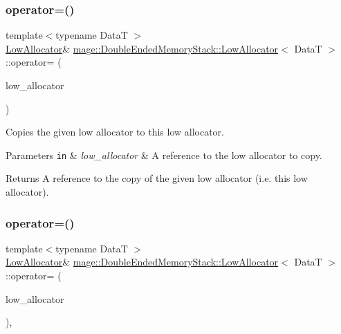 \subsubsection{\texorpdfstring{operator=()}{operator=()}\hspace{0.1cm}{\footnotesize\ttfamily [1/2]}}
{\footnotesize\ttfamily template$<$typename DataT $>$ \\
\hyperlink{classmage_1_1_double_ended_memory_stack_1_1_low_allocator}{Low\+Allocator}\& \hyperlink{classmage_1_1_double_ended_memory_stack_1_1_low_allocator}{mage\+::\+Double\+Ended\+Memory\+Stack\+::\+Low\+Allocator}$<$ DataT $>$\+::operator= (\begin{DoxyParamCaption}\item[{const \hyperlink{classmage_1_1_double_ended_memory_stack_1_1_low_allocator}{Low\+Allocator}$<$ DataT $>$ \&}]{low\+\_\+allocator }\end{DoxyParamCaption})\hspace{0.3cm}{\ttfamily [delete]}}

Copies the given low allocator to this low allocator.


\begin{DoxyParams}[1]{Parameters}
\mbox{\tt in}  & {\em low\+\_\+allocator} & A reference to the low allocator to copy. \\
\hline
\end{DoxyParams}
\begin{DoxyReturn}{Returns}
A reference to the copy of the given low allocator (i.\+e. this low allocator). 
\end{DoxyReturn}
\hypertarget{classmage_1_1_double_ended_memory_stack_1_1_low_allocator_ab38a1abc19a31fdb8b62119d67749fa0}{}\label{classmage_1_1_double_ended_memory_stack_1_1_low_allocator_ab38a1abc19a31fdb8b62119d67749fa0} 
\subsubsection{\texorpdfstring{operator=()}{operator=()}\hspace{0.1cm}{\footnotesize\ttfamily [2/2]}}
{\footnotesize\ttfamily template$<$typename DataT $>$ \\
\hyperlink{classmage_1_1_double_ended_memory_stack_1_1_low_allocator}{Low\+Allocator}\& \hyperlink{classmage_1_1_double_ended_memory_stack_1_1_low_allocator}{mage\+::\+Double\+Ended\+Memory\+Stack\+::\+Low\+Allocator}$<$ DataT $>$\+::operator= (\begin{DoxyParamCaption}\item[{\hyperlink{classmage_1_1_double_ended_memory_stack_1_1_low_allocator}{Low\+Allocator}$<$ DataT $>$ \&\&}]{low\+\_\+allocator }\end{DoxyParamCaption})\hspace{0.3cm}{\ttfamily [default]}, {\ttfamily [noexcept]}}

